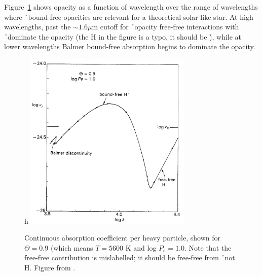 Figure~\ref{fig:bohmopacity} shows  opacity as a function of wavelength over the range of wavelengths where \h\ bound-free opacities are relevant for a theoretical solar-like star.  At high wavelengths, past the $\sim 1.6 \mu$m cutoff for \h\ opacity free-free interactions with \h\ dominate the opacity (the H in the figure is a typo, it should be \h), while at lower wavelengths Balmer bound-free absorption begins to dominate the opacity.
\begin{figure}{h}
\includegraphics[width=80mm]{figs/hminusopacity.png}
\caption{\label{fig:bohmopacity}Continuous absorption coefficient per heavy particle, shown for $\Theta=0.9$ (which means $T=5600$ K and log $P_e=1.0$.  Note that the free-free contribution is mislabelled; it should be free-free from \h\ not H.  Figure from \cite{boehm1989}.}
\end{figure}


